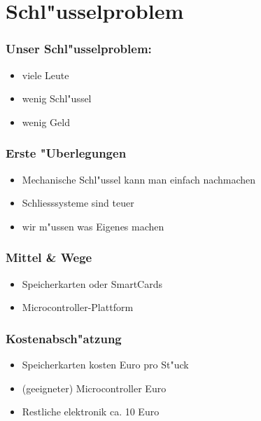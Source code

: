 \section{Schl"usselproblem}
\begin{frame}
	\frametitle{Unser Schl"usselproblem:}
	\begin{itemize}
		\item viele Leute
		\item wenig Schl"ussel
		\item wenig Geld
	\end{itemize}
\end{frame}

\begin{frame}
	\frametitle{Erste "Uberlegungen}
	\begin{itemize}
		\item Mechanische Schl"ussel kann man einfach nachmachen
		\item Schliesssysteme sind teuer
		\item \to wir m"ussen was Eigenes machen
	\end{itemize}
\end{frame}

\begin{frame}
	\frametitle{Mittel \& Wege}
	\begin{itemize}
		\item Speicherkarten oder SmartCards
		\item Microcontroller-Plattform
	\end{itemize}
\end{frame}

\begin{frame}
	\frametitle{Kostenabsch"atzung}
	\begin{itemize}
		\item Speicherkarten kosten  Euro pro St"uck
		\item (geeigneter) Microcontroller  Euro
		\item Restliche elektronik ca. 10 Euro
	\end{itemize}
\end{frame}

